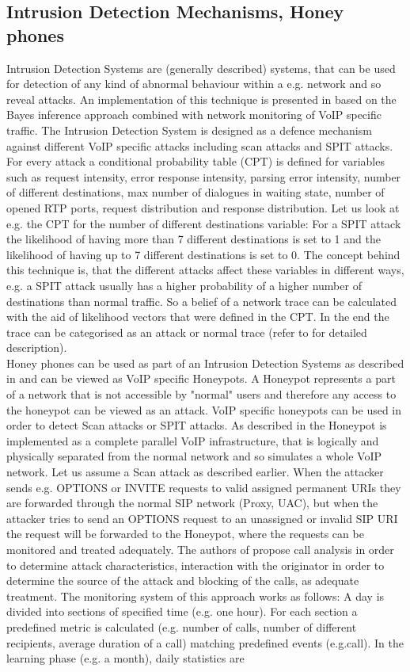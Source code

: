 \documentclass[final
	]{issa}
\begin{document}
\subsection{Intrusion Detection Mechanisms, Honey phones}
Intrusion Detection Systems are (generally described) systems, that can be used for detection of any kind of abnormal behaviour within a e.g. network and so reveal attacks. An implementation of this technique is presented in \cite{paper:intrusion} based on the Bayes inference approach combined with network monitoring of VoIP specific traffic. The Intrusion Detection System is designed as a defence mechanism against different VoIP specific attacks including scan attacks and SPIT attacks. For every attack a conditional probability table (CPT) is defined for variables such as request intensity, error response intensity, parsing error intensity, number of different destinations, max number of dialogues in waiting state, number of opened RTP ports, request distribution and response distribution. Let us look at e.g. the CPT for the number of different destinations variable: For a SPIT attack the likelihood of having more than 7 different destinations is set to 1 and the likelihood of having up to 7 different destinations is set to 0. The concept behind this technique is, that the different attacks affect these variables in different ways, e.g. a SPIT attack usually has a higher probability of a higher number of destinations than normal traffic. So a belief of a network trace can be calculated with the aid of likelihood vectors that were defined in the CPT. In the end the trace can be categorised as an attack or normal trace (refer to \cite{paper:intrusion} for detailed description).\\
Honey phones can be used as part of an Intrusion Detection Systems as described in \cite{paper:SPITreach} \cite{paper:heoneyhol} and can be viewed as VoIP specific Honeypots. A Honeypot represents a part of a network that is not accessible by "normal" users and therefore any access to the honeypot can be viewed as an attack. VoIP specific honeypots can be used in order to detect Scan attacks or SPIT attacks. As described in \cite{paper:heoneyhol} the Honeypot is implemented as a complete parallel VoIP infrastructure, that is logically and physically separated from the normal network and so simulates a whole VoIP network. Let us assume a Scan attack as described earlier. When the attacker sends e.g. OPTIONS or INVITE requests to valid assigned permanent URIs they are forwarded through the normal SIP network (Proxy, UAC), but when the attacker tries to send an OPTIONS request to an unassigned or invalid SIP URI the request will be forwarded to the Honeypot, where the requests can be monitored and treated adequately. The authors of \cite{paper:heoneyhol} propose call analysis in order to determine attack characteristics, interaction with the originator in order to determine the source of the attack and blocking of the calls, as adequate treatment. The monitoring system of this approach works as follows: A day is divided into sections of specified time (e.g. one hour). For each section a predefined metric is calculated (e.g. number of calls, number of different recipients, average duration of a call) matching predefined events (e.g.call). In the learning phase (e.g. a month), daily statistics are
\end{document}
